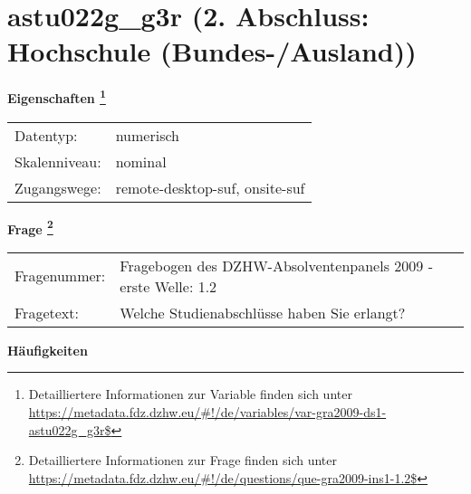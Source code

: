 
    \setcounter{footnote}{0}

    \vspace*{-1.8cm}
	\section{astu022g\_g3r (2. Abschluss: Hochschule (Bundes-/Ausland))}
	\label{section:astu022g_g3r}



    \vspace*{0.5cm}
    \noindent\textbf{Eigenschaften
	\footnote{Detailliertere Informationen zur Variable finden sich unter
		\url{https://metadata.fdz.dzhw.eu/\#!/de/variables/var-gra2009-ds1-astu022g_g3r$}}}\\
	\begin{tabularx}{\hsize}{@{}lX}
	Datentyp: & numerisch \\
	Skalenniveau: & nominal \\
	Zugangswege: &
	  remote-desktop-suf, 
	  onsite-suf
 \\
    \end{tabularx}



				\vspace*{0.5cm}
                \noindent\textbf{Frage
	                \footnote{Detailliertere Informationen zur Frage finden sich unter
		              \url{https://metadata.fdz.dzhw.eu/\#!/de/questions/que-gra2009-ins1-1.2$}}}\\
				\begin{tabularx}{\hsize}{@{}lX}
					Fragenummer: &
					  Fragebogen des DZHW-Absolventenpanels 2009 - erste Welle:
					  1.2
 \\
					Fragetext: & Welche Studienabschlüsse haben Sie erlangt? \\
				\end{tabularx}





        		\vspace*{0.5cm}
                \noindent\textbf{Häufigkeiten}

